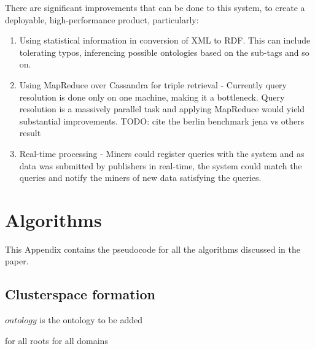\documentclass[conference]{IEEEtran}
\begin{document}
There are significant improvements that can be done to this system, to create a deployable, high-performance product, particularly:

\begin{enumerate}
    \item Using statistical information in conversion of XML to RDF. This can include tolerating typos, inferencing possible ontologies based on the sub-tags and so on.
    \item Using MapReduce over Cassandra for triple retrieval - Currently query resolution is done only on one machine, making it a bottleneck. Query resolution is a massively parallel task and applying MapReduce\cite{Dean04mapreduce:simplified}\cite{hus09hadoop} would yield substantial improvements. TODO: cite the berlin benchmark jena vs others result
    \item Real-time processing - Miners could register queries with the system and as data was submitted by publishers in real-time, the system could match the queries and notify the miners of new data satisfying the queries\cite{Aba03aurora}.
\end{enumerate}

\pagebreak
\appendix
\section{Algorithms}
This Appendix contains the pseudocode for all the algorithms discussed in the paper.

\subsection{Clusterspace formation}
\label{cs-algo}
\begin{algorithmic}
        \Require $ontology$ is the ontology to be added
            \State \Return
        \EndIf

            \State {}
        \EndFor

            \State {}
        \EndFor

            \State {}
                    \State {}
                \EndFor
            \EndIf
                \State {}
            \EndFor
        \EndFor

                \State {} for all roots
            \Else
                \State {} for all domains
            \EndIf
        \EndFor
    \EndFunction
\end{algorithmic}
\end{document}
